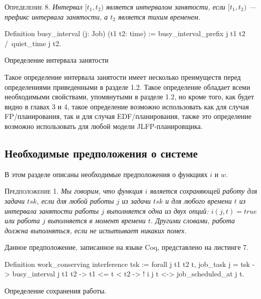 \textsc{Определение 8.}
\textit{Интервал $[t_1,t_2)$ является интервалом занятости,
  если $[t_1,t_2)$ --- префикс интервала занятости, а $t_2$ является тихим временем.
}


\begin{listing}
\begin{pyglist}[numbers=none,numbersep=5pt, fontsize=\small]
  Definition busy_interval (j: Job) (t1 t2: time) :=
    busy_interval_prefix j t1 t2 /\
    quiet_time j t2.
\end{pyglist}
\caption{Определение интервала занятости}
\label{lst:theorem2}
\end{listing}

Такое определение интервала занятости имеет несколько преимуществ перед определениями
  приведенными в разделе 1.2. Такое определение обладает всеми необходимыми свойствами,
  упомянутыми в разделе 1.2, но кроме того, как будет видно в главах 3 и 4, такое
  определение возможно использовать как для случая FP\-/планирования,
  так и для случая EDF\-/планирования, также это определение возможно использовать
  для любой модели JLFP-планировщика.

\subsection{Необходимые предположения о системе}

В этом разделе описаны необходимые предположения о функциях $i$ и $w$.

\textsc{Предположение 1.}
\textit{Мы говорим, что функция $i$ является сохраняющей работу для задачи $tsk$,
  если для любой работы $j$ из задачи $tsk$ и для любого времени $t$ из интервала
  занятости работы $j$ выполняется одна из двух опций: $i(j, t) = true$ или работа
  $j$ выполняется в момент времени $t$. Другими словами, работа должна выполняться,
  если не испытывает никаких помех. }

Данное предположение, записанное на языке Coq, представлено на листинге 7.

\begin{listing}
\begin{pyglist}[numbers=none,numbersep=5pt, fontsize=\small]
  Definition work_conserving interference tsk :=
    forall j t1 t2 t,
      job_task j = tsk ->
      busy_interval j t1 t2 ->
      t1 <= t < t2 ->
      ! i j t <-> job_scheduled_at j t.
\end{pyglist}
\caption{Определение сохранения работы.}
\label{lst:theorem2}
\end{listing}


